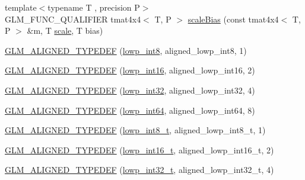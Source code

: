 \begin{DoxyCompactItemize}
\item 
{\footnotesize template$<$typename T , precision P$>$ }\\G\+L\+M\+\_\+\+F\+U\+N\+C\+\_\+\+Q\+U\+A\+L\+I\+F\+I\+E\+R tmat4x4$<$ T, P $>$ \hyperlink{namespaceglm_adbeb5797a566d90d7720b59d29375fe3}{scale\+Bias} (const tmat4x4$<$ T, P $>$ \&m, T \hyperlink{group__gtc__matrix__transform_ga8f062fcc07e2445500793f2803afebb0}{scale}, T bias)
\item 
\hyperlink{group__gtx__type__aligned_gab5cd5c5fad228b25c782084f1cc30114}{G\+L\+M\+\_\+\+A\+L\+I\+G\+N\+E\+D\+\_\+\+T\+Y\+P\+E\+D\+E\+F} (\hyperlink{group__gtc__type__precision_gaf9e675b6392764242ae87eb179e9d3d6}{lowp\+\_\+int8}, aligned\+\_\+lowp\+\_\+int8, 1)
\item 
\hyperlink{group__gtx__type__aligned_ga5bb5dd895ef625c1b113f2cf400186b0}{G\+L\+M\+\_\+\+A\+L\+I\+G\+N\+E\+D\+\_\+\+T\+Y\+P\+E\+D\+E\+F} (\hyperlink{group__gtc__type__precision_ga71fc0c399fa4780507748b643733f153}{lowp\+\_\+int16}, aligned\+\_\+lowp\+\_\+int16, 2)
\item 
\hyperlink{group__gtx__type__aligned_gac6efa54cf7c6c86f7158922abdb1a430}{G\+L\+M\+\_\+\+A\+L\+I\+G\+N\+E\+D\+\_\+\+T\+Y\+P\+E\+D\+E\+F} (\hyperlink{group__gtc__type__precision_gad9939c9d6fec1c6accc02a83c6500f08}{lowp\+\_\+int32}, aligned\+\_\+lowp\+\_\+int32, 4)
\item 
\hyperlink{group__gtx__type__aligned_ga6612eb77c8607048e7552279a11eeb5f}{G\+L\+M\+\_\+\+A\+L\+I\+G\+N\+E\+D\+\_\+\+T\+Y\+P\+E\+D\+E\+F} (\hyperlink{group__gtc__type__precision_gab8a8e75af347592406e41b3ae2c0712b}{lowp\+\_\+int64}, aligned\+\_\+lowp\+\_\+int64, 8)
\item 
\hyperlink{group__gtx__type__aligned_ga7ddc1848ff2223026db8968ce0c97497}{G\+L\+M\+\_\+\+A\+L\+I\+G\+N\+E\+D\+\_\+\+T\+Y\+P\+E\+D\+E\+F} (\hyperlink{group__gtc__type__precision_gae6092311f6970a305c2df19a372360a3}{lowp\+\_\+int8\+\_\+t}, aligned\+\_\+lowp\+\_\+int8\+\_\+t, 1)
\item 
\hyperlink{group__gtx__type__aligned_ga22240dd9458b0f8c11fbcc4f48714f68}{G\+L\+M\+\_\+\+A\+L\+I\+G\+N\+E\+D\+\_\+\+T\+Y\+P\+E\+D\+E\+F} (\hyperlink{group__gtc__type__precision_gae34c3d53c4c1434fc9f26538b0185667}{lowp\+\_\+int16\+\_\+t}, aligned\+\_\+lowp\+\_\+int16\+\_\+t, 2)
\item 
\hyperlink{group__gtx__type__aligned_ga8130ea381d76a2cc34a93ccbb6cf487d}{G\+L\+M\+\_\+\+A\+L\+I\+G\+N\+E\+D\+\_\+\+T\+Y\+P\+E\+D\+E\+F} (\hyperlink{group__gtc__type__precision_gad9567c806dc39f534174eef42663119d}{lowp\+\_\+int32\+\_\+t}, aligned\+\_\+lowp\+\_\+int32\+\_\+t, 4)

\end{DoxyCompactItemize}
